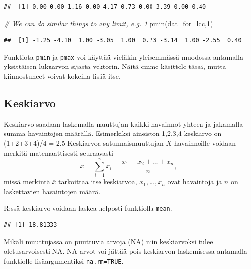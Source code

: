 \documentclass[
]{book}
\newenvironment{Shaded}{\begin{snugshade}}{\end{snugshade}}
\newcommand{\CommentTok}[1]{\textcolor[rgb]{0.56,0.35,0.01}{\textit{#1}}}
\newcommand{\DecValTok}[1]{\textcolor[rgb]{0.00,0.00,0.81}{#1}}
\newcommand{\FunctionTok}[1]{\textcolor[rgb]{0.00,0.00,0.00}{#1}}
\newcommand{\NormalTok}[1]{#1}
\newcommand{\OtherTok}[1]{\textcolor[rgb]{0.56,0.35,0.01}{#1}}
\newcommand{\SpecialCharTok}[1]{\textcolor[rgb]{0.00,0.00,0.00}{#1}}
\begin{document}
\begin{verbatim}
##  [1] 0.00 0.00 1.16 0.00 4.17 0.73 0.00 3.39 0.00 0.40
\end{verbatim}

\begin{Shaded}
\begin{Highlighting}[]
\CommentTok{\# We can do similar things to any limit, e.g. 1}
\FunctionTok{pmin}\NormalTok{(dat\_for\_loc,}\DecValTok{1}\NormalTok{)}
\end{Highlighting}
\end{Shaded}

\begin{verbatim}
##  [1] -1.25 -4.10  1.00 -3.05  1.00  0.73 -3.14  1.00 -2.55  0.40
\end{verbatim}

Funktiota \texttt{pmin} ja \texttt{pmax} voi käyttää vieläkin yleisemmässä muodossa antamalla yksittäisen lukuarvon sijasta vektorin. Näitä emme käsittele tässä, mutta kiinnostuneet voivat kokeilla lisää itse.

\hypertarget{keskiarvo}{%
\subsection{Keskiarvo}\label{keskiarvo}}

Keskiarvo saadaan laskemalla muuttujan kaikki havainnot yhteen ja jakamalla summa havaintojen määrällä. Esimerkiksi aineiston 1,2,3,4 keskiarvo on (1+2+3+4)/4 = 2.5 Keskiarvoa satunnaismuuttujan \(X\) havainnoille voidaan merkitä matemaattisesti seuraavasti
\[\overline{x} = \sum_{i=1}^n x_i = \frac{x_1+x_2+\dots+x_n}{n},\]
missä merkintä \(\overline{x}\) tarkoittaa itse keskiarvoa, \(x_1,...,x_n\) ovat havaintoja ja \(n\) on laskettavien havaintojen määrä.

R:ssä keskiarvo voidaan laskea helposti funktiolla \texttt{mean}.

\begin{Shaded}
\end{Shaded}

\begin{verbatim}
## [1] 18.81333
\end{verbatim}

Mikäli muuttujassa on puuttuvia arvoja (NA) niin keskiarvoksi tulee oletusarvoisesti NA. NA-arvot voi jättää pois keskiarvon laskemisessa antamalla funktiolle lisäargumentiksi \texttt{na.rm=TRUE}.
\end{document}
